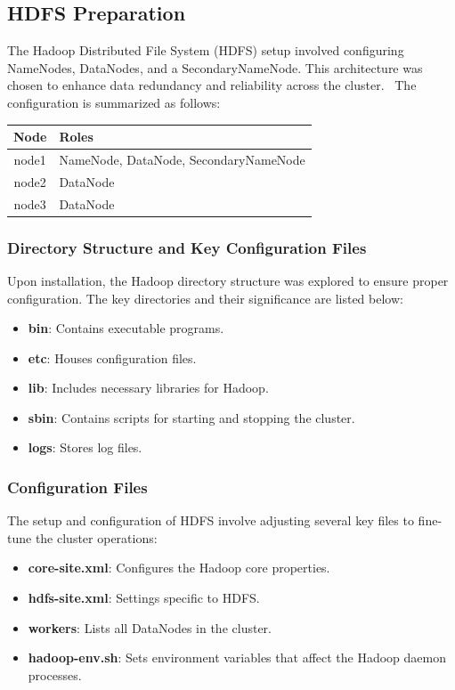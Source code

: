 \documentclass[12pt,a4paper]{article}
\begin{document}
\begin{multicols}{2}
\subsection{HDFS Preparation}
The Hadoop Distributed File System (HDFS) \cite{hadoop_cluster_setup} setup involved configuring NameNodes, DataNodes, and a SecondaryNameNode. This architecture was chosen to enhance data redundancy and reliability across the cluster. \
The configuration is summarized as follows:

\begin{center}
    \begin{tabularx}{\columnwidth}{|c|X|}
    \hline
    Node & Roles \\
    \hline
    node1 & NameNode, DataNode, SecondaryNameNode \\
    node2 & DataNode \\
    node3 & DataNode \\
    \hline
    \end{tabularx}
    \label{tab:hdfs_roles}
\end{center}

\subsubsection{Directory Structure and Key Configuration Files}
Upon installation, the Hadoop directory structure was explored to ensure proper configuration. The key directories and their significance are listed below:
\begin{itemize}
    \item \textbf{bin}: Contains executable programs.
    \item \textbf{etc}: Houses configuration files.
    \item \textbf{lib}: Includes necessary libraries for Hadoop.
    \item \textbf{sbin}: Contains scripts for starting and stopping the cluster.
    \item \textbf{logs}: Stores log files.
\end{itemize}

\subsubsection{Configuration Files}
The setup and configuration of HDFS involve adjusting several key files to fine-tune the cluster operations:
\begin{itemize}
    \item \textbf{core-site.xml}: Configures the Hadoop core properties.
    \item \textbf{hdfs-site.xml}: Settings specific to HDFS.
    \item \textbf{workers}: Lists all DataNodes in the cluster.
    \item \textbf{hadoop-env.sh}: Sets environment variables that affect the Hadoop daemon processes.
\end{itemize}


\end{multicols}
\end{document}

